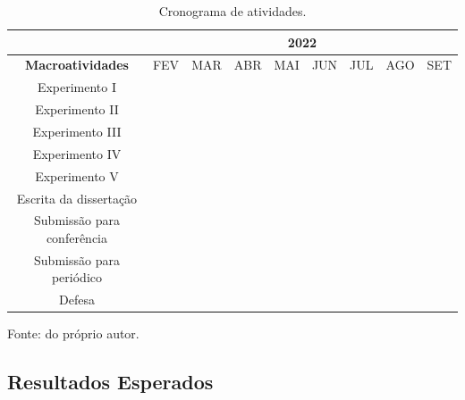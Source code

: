 \begin{table}[ht]
    \centering
    \caption{Cronograma de atividades.}
    \label{proposal:cron:table:2}
        \begin{tabular}{|c|c|c|c|c|c|c|l|l|} 
            \hline
                                    & \multicolumn{8}{c|}{2022}                        \\ 
            \hline
            \textbf{Macroatividades}        & FEV & MAR & ABR & MAI & JUN & JUL & AGO & SET  \\ 
            \hline
            Experimento I                   & \cellcolor{midgray} & \cellcolor{midgray} & \cellcolor{midgray} &     &     &     &     &      \\ 
            \hline
            Experimento II                 &     & \cellcolor{midgray} & \cellcolor{midgray} &     &     &     &     &      \\ 
            \hline
            Experimento III                  &     &     &     & \cellcolor{midgray} & \cellcolor{midgray} & \cellcolor{midgray} &     &  \\ 
            \hline
            Experimento IV                  &     &     &     & \cellcolor{midgray} & \cellcolor{midgray} &     &     &      \\ 
            \hline
            Experimento V                   &     &     &     &     &     & \cellcolor{midgray} &     &      \\ 
            \hline
            Escrita da dissertação          & \cellcolor{midgray} & \cellcolor{midgray} & \cellcolor{midgray} & \cellcolor{midgray} & \cellcolor{midgray} & \cellcolor{midgray} & \cellcolor{midgray} &  \\ 
            \hline
            Submissão para conferência      &     &     &     & \cellcolor{midgray} &     &     &     &      \\ 
            \hline
            Submissão para periódico        &     &     &     &     &     &     & \cellcolor{midgray} &      \\ 
            \hline
            Defesa                          &     &     &     &     &     &     &     & \cellcolor{midgray} \\
            \hline
        \end{tabular}
    
    \vspace*{1 cm}
    Fonte: do próprio autor.
\end{table}

\subsection{Resultados Esperados}
\label{proposal:expres}